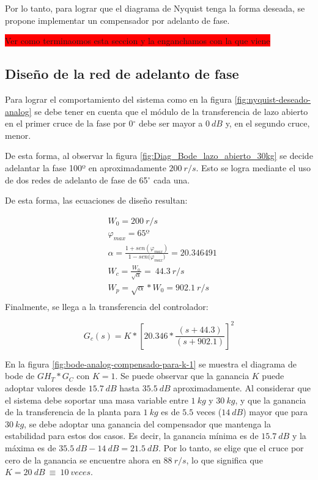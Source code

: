 Por lo tanto, para lograr que el diagrama de Nyquist tenga la forma deseada, se propone implementar un compensador por adelanto de fase.

\colorbox{red}{Ver como terminaomos esta seccion y la enganchamos con la que viene}


\subsection{Diseño de la red de adelanto de fase}

Para lograr el comportamiento del sistema como en la figura 	\ref{fig:nyquist-deseado-analog} se debe tener en cuenta que el m\'{o}dulo de la transferencia de lazo abierto en el primer cruce de la fase por 0$\mathrm{{}^\circ}$ debe ser mayor a $0\:dB$ y, en el segundo cruce, menor. 

De esta forma, al observar la figura \ref{fig:Diag_Bode_lazo_abierto_30kg} se decide adelantar la fase 100º en aproximadamente $200\:r/s$. Esto se logra mediante el uso de dos redes de adelanto de fase de 65$\mathrm{{}^\circ}$ cada una. 


\noindent De esta forma, las ecuaciones de dise\~{n}o resultan:

\begin{equation*}
	\begin{aligned}
		&W_0 =200\:r/s\\
		&{\varphi }_{max} =65\textrm{º}\\
		&\alpha =\frac{1+sen({\varphi }_{max})}{1-sen{(\varphi }_{max})}=20.346491\\
		&W_c =\frac{W_0}{\sqrt{\alpha }}=\ 44.3\:r/s\\
		&W_p =\sqrt{\alpha }*W_0=902.1\: r/s\\
	\end{aligned}
\end{equation*} 
\noindent Finalmente, se llega a la transferencia del controlador:

\begin{equation}  
	G_c(s)=K*{[20.346*\frac{(s+44.3)}{(s+902.1)}]}^2
\end{equation} 

\noindent En la figura \ref{fig:bode-analog-compensado-para-k-1} se muestra el diagrama de bode de ${GH}_T*G_C$ con $K=1$. Se puede observar que la ganancia $K$ puede adoptar valores desde $15.7\:dB$ hasta $35.5\:dB$ aproximadamente. Al considerar que el sistema debe soportar una masa variable entre $1\:kg$ y $30\:kg$, y que la ganancia de la transferencia de la planta para $1\:kg$ es de $5.5$ veces ($14\:dB$) mayor que para $30\:kg$, se debe adoptar una ganancia del compensador que mantenga la estabilidad para estos dos casos. Es decir, la ganancia m\'{i}nima es de $15.7\:dB$ y la m\'{a}xima es de $35.5\:dB - 14\:dB = 21.5\:dB$. Por lo tanto, se elige que el cruce por cero de la ganancia se encuentre ahora en $88\:r/s$, lo que significa que $K=20\:dB\ \equiv \ 10\: veces$.


